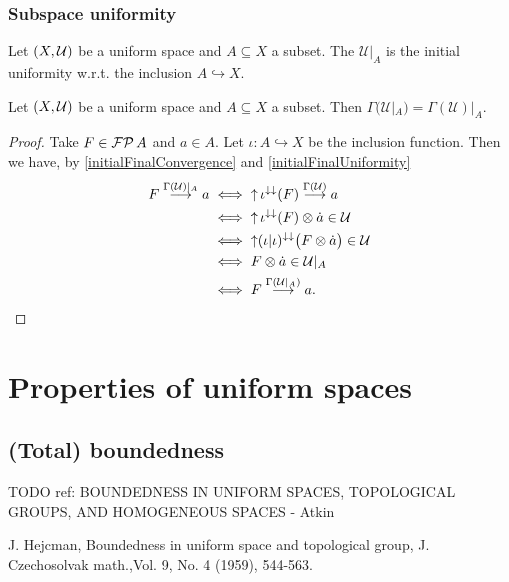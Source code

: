 \subsubsection{Subspace uniformity}
\begin{definition}
Let $\left( X, \mathcal{U} \right)$ be a uniform space and $A\subseteq X$ a subset. The  $\mathcal{U}|_A$ is the initial uniformity w.r.t. the inclusion $A\hookrightarrow X$.
\end{definition}

\begin{proposition} \label{subspaceUniformConvergence}
Let $\left( X, \mathcal{U} \right)$ be a uniform space and $A\subseteq X$ a subset. Then $\Gamma(\mathcal{U}|_A) = \Gamma(\mathcal{U})|_A$. 
\end{proposition}
\begin{proof}
Take $F\in \operatorname{\mathcal{FP}}{A}$ and $a\in A$. Let $\iota: A\hookrightarrow X$ be the inclusion function. Then we have, by \ref{initialFinalConvergence} and \ref{initialFinalUniformity}
\begin{align*}
F \overset{\Gamma(\mathcal{U})|_A}{\longrightarrow} a &\iff \operatorname{\uparrow}\iota^{\downarrow\downarrow}(F) \overset{\Gamma(\mathcal{U})}{\longrightarrow} a \\
&\iff \operatorname{\uparrow}\iota^{\downarrow\downarrow}(F)\otimes \dot{a} \in \mathcal{U} \\
&\iff \operatorname{\uparrow}(\iota|\iota)^{\downarrow\downarrow}\big(F\otimes \dot{a}\big) \in \mathcal{U} \\
&\iff F\otimes \dot{a} \in \mathcal{U}|_A \\
&\iff F \overset{\Gamma(\mathcal{U}|_A)}{\longrightarrow} a.
\end{align*}
\end{proof}

\section{Properties of uniform spaces}
\subsection{(Total) boundedness}
TODO ref: BOUNDEDNESS IN UNIFORM SPACES, TOPOLOGICAL GROUPS, AND HOMOGENEOUS SPACES - Atkin

J. Hejcman, Boundedness in uniform space and topological group, J. Czechosolvak
math.,Vol. 9, No. 4 (1959), 544-563.

